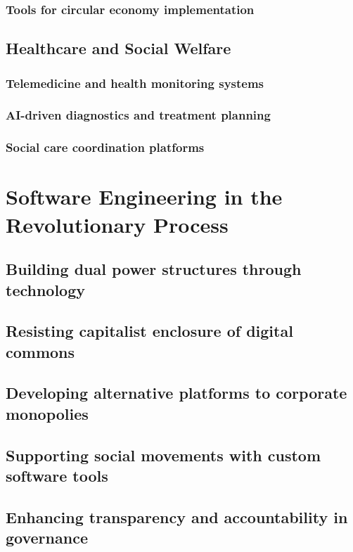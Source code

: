 \subsubsection{Tools for circular economy implementation}
\subsection{Healthcare and Social Welfare}
\subsubsection{Telemedicine and health monitoring systems}
\subsubsection{AI-driven diagnostics and treatment planning}
\subsubsection{Social care coordination platforms}

\newpage

\section{Software Engineering in the Revolutionary Process}
\subsection{Building dual power structures through technology}
\subsection{Resisting capitalist enclosure of digital commons}
\subsection{Developing alternative platforms to corporate monopolies}
\subsection{Supporting social movements with custom software tools}
\subsection{Enhancing transparency and accountability in governance}

\newpage

